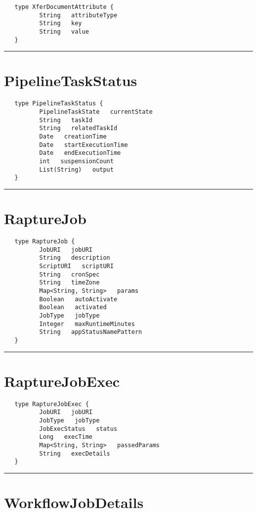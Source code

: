 \begin{Verbatim}
   type XferDocumentAttribute {
          String   attributeType
          String   key
          String   value
   }
\end{Verbatim}

\rule{12cm}{2pt}
\section{PipelineTaskStatus}
\label{type:PipelineTaskStatus}

\begin{Verbatim}
   type PipelineTaskStatus {
          PipelineTaskState   currentState
          String   taskId
          String   relatedTaskId
          Date   creationTime
          Date   startExecutionTime
          Date   endExecutionTime
          int   suspensionCount
          List(String)   output
   }
\end{Verbatim}

\rule{12cm}{2pt}
\section{RaptureJob}
\label{type:RaptureJob}

\begin{Verbatim}
   type RaptureJob {
          JobURI   jobURI
          String   description
          ScriptURI   scriptURI
          String   cronSpec
          String   timeZone
          Map<String, String>   params
          Boolean   autoActivate
          Boolean   activated
          JobType   jobType
          Integer   maxRuntimeMinutes
          String   appStatusNamePattern
   }
\end{Verbatim}

\rule{12cm}{2pt}
\section{RaptureJobExec}
\label{type:RaptureJobExec}

\begin{Verbatim}
   type RaptureJobExec {
          JobURI   jobURI
          JobType   jobType
          JobExecStatus   status
          Long   execTime
          Map<String, String>   passedParams
          String   execDetails
   }
\end{Verbatim}

\rule{12cm}{2pt}
\section{WorkflowJobDetails}
\label{type:WorkflowJobDetails}


